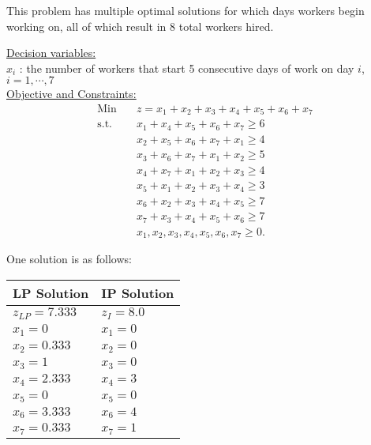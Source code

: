     
    \begin{solution} This problem has multiple optimal solutions for which days workers begin working on, all of which result in 8 total workers hired. 
    
    \underline{Decision variables:} \\
    $x_i$ : the number of workers that start 5 consecutive days of work on day $i$, $ i = 1,\cdots,7$ \\
    \smallskip \underline{Objective and Constraints:}
    \begin{align*}
    \mbox{Min~~ } & z = x_1 + x_2 + x_3 + x_4 + x_5 + x_6 + x_7  \\
    \mbox{s.t.~~} & x_1 + x_4 + x_5 + x_6 + x_7 \ge 6 \\
    & x_2 + x_5 + x_6 + x_7 + x_1 \ge 4 \\
    & x_3 + x_6 + x_7 + x_1 + x_2 \ge 5 \\
    & x_4 + x_7 + x_1 + x_2 + x_3 \ge 4 \\
    & x_5 + x_1 + x_2 + x_3 + x_4 \ge 3 \\
    & x_6 + x_2 + x_3 + x_4 + x_5 \ge 7 \\
    & x_7 + x_3 + x_4 + x_5 + x_6 \ge 7 \\
    & x_1, x_2, x_3, x_4, x_5, x_6, x_7 \ge 0.
    \end{align*}
    
    One solution is as follows:
    \begin{center} \begin{tabular} {|l|l|}
    \hline   LP Solution        & IP Solution \\
    \hline  $z_{LP} = 7.333$    & $z_I = 8.0$ \\
    \hline  $x_1 = 0$           & $x_1 = 0$ \\
    \hline  $x_2 = 0.333$       & $x_2 = 0 $ \\
    \hline  $x_3 = 1$           & $x_3 = 0$ \\
    \hline  $x_4 = 2.333$       & $x_4 = 3$ \\
    \hline  $x_5 = 0$           & $x_5 = 0 $ \\
    \hline  $x_6 = 3.333$       & $x_6 = 4 $ \\
    \hline  $x_7 = 0.333$       & $x_7 = 1 $ \\
    \hline
    \end{tabular} \end{center} 
    \end{solution}
    